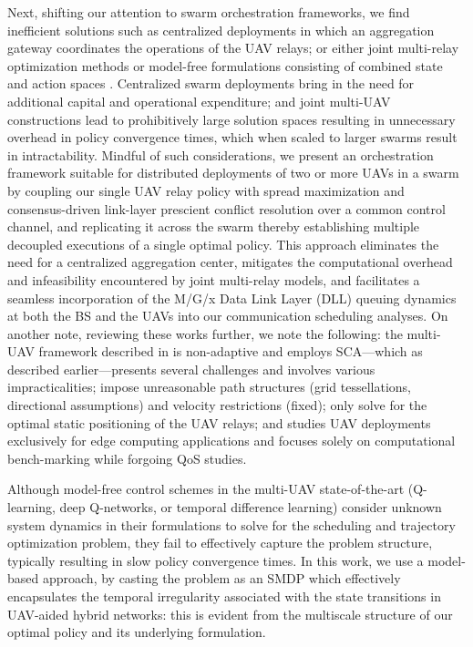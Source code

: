 \documentclass[12pt, draftcls, onecolumn]{IEEEtran}
\theoremstyle{plain}
\theoremstyle{definition}
\theoremstyle{remark}
\begin{document}
Next, shifting our attention to swarm orchestration frameworks, we find inefficient solutions such as centralized deployments \cite{JointTrajectoryDesign, MultiDroneDeployment, CSCA-ADMM} in which an aggregation gateway coordinates the operations of the UAV relays; or either joint multi-relay optimization methods \cite{CSCA-ADMM, GameTheory, UAVDynamicCoverage} or model-free formulations consisting of combined state and action spaces \cite{DDQN, MEC-DDPG, DQNPositioning, MLDeployment}. Centralized swarm deployments bring in the need for additional capital and operational expenditure; and joint multi-UAV constructions lead to prohibitively large solution spaces resulting in unnecessary overhead in policy convergence times, which when scaled to larger swarms result in intractability. Mindful of such considerations, we present an orchestration framework suitable for distributed deployments of two or more UAVs in a swarm by coupling our single UAV relay policy with spread maximization and consensus-driven link-layer prescient conflict resolution over a common control channel, and replicating it across the swarm thereby establishing multiple decoupled executions of a single optimal policy. This approach eliminates the need for a centralized aggregation center, mitigates the computational overhead and infeasibility encountered by joint multi-relay models, and facilitates a seamless incorporation of the M/G/x Data Link Layer (DLL) queuing dynamics at both the BS and the UAVs into our communication scheduling analyses. On another note, reviewing these works further, we note the following: the multi-UAV framework described in \cite{CSCA-ADMM} is non-adaptive and employs SCA---which as described earlier---presents several challenges and involves various impracticalities; \cite{DDQN, MEC-DDPG} impose unreasonable path structures (grid tessellations, directional assumptions) and velocity restrictions (fixed); \cite{DQNPositioning, MLDeployment} only solve for the optimal static positioning of the UAV relays; and \cite{MEC-DDPG} studies UAV deployments exclusively for edge computing applications and focuses solely on computational bench-marking while forgoing QoS studies. 

Although model-free control schemes in the multi-UAV state-of-the-art (Q-learning, deep Q-networks, or temporal difference learning) \cite{DDQN, MEC-DDPG, RLSenseSend, DQNPositioning, MLDeployment} consider unknown system dynamics in their formulations to solve for the scheduling and trajectory optimization problem, they fail to effectively capture the problem structure, typically resulting in slow policy convergence times. In this work, we use a model-based approach, by casting the problem as an SMDP which effectively encapsulates the temporal irregularity associated with the state transitions in UAV-aided hybrid networks: this is evident from the multiscale structure of our optimal policy and its underlying formulation.
\end{document}
